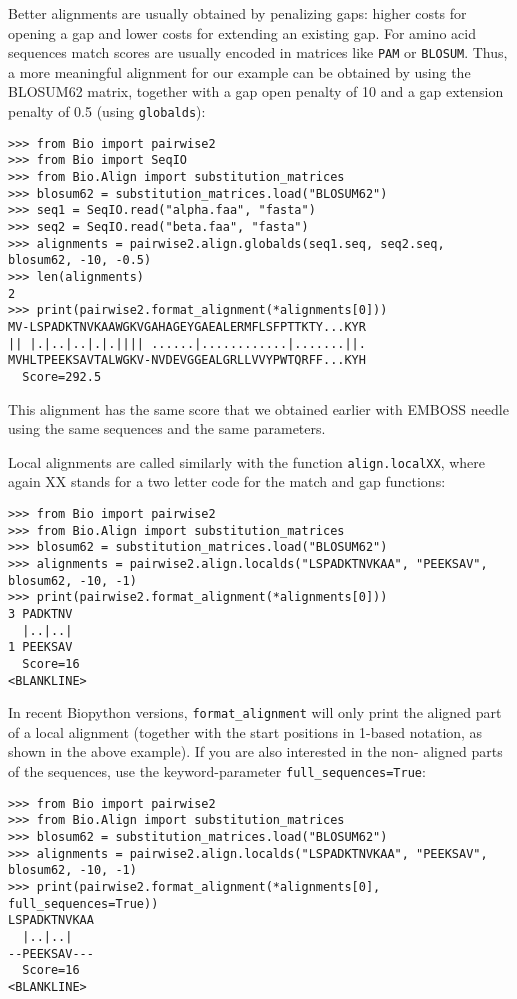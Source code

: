 Better alignments are usually obtained by penalizing gaps: higher costs
for opening a gap and lower costs for extending an existing gap. For amino
acid sequences match scores are usually encoded in matrices like \texttt{PAM}
or \texttt{BLOSUM}. Thus, a more meaningful alignment for our example can be
obtained by using the BLOSUM62 matrix, together with a gap open penalty of 10
and a gap extension penalty of 0.5 (using \verb|globalds|):

\begin{verbatim}
>>> from Bio import pairwise2
>>> from Bio import SeqIO
>>> from Bio.Align import substitution_matrices
>>> blosum62 = substitution_matrices.load("BLOSUM62")
>>> seq1 = SeqIO.read("alpha.faa", "fasta")
>>> seq2 = SeqIO.read("beta.faa", "fasta")
>>> alignments = pairwise2.align.globalds(seq1.seq, seq2.seq, blosum62, -10, -0.5)
>>> len(alignments)
2
>>> print(pairwise2.format_alignment(*alignments[0]))
MV-LSPADKTNVKAAWGKVGAHAGEYGAEALERMFLSFPTTKTY...KYR
|| |.|..|..|.|.|||| ......|............|.......||.
MVHLTPEEKSAVTALWGKV-NVDEVGGEALGRLLVVYPWTQRFF...KYH
  Score=292.5

\end{verbatim}

This alignment has the same score that we obtained earlier with EMBOSS needle
using the same sequences and the same parameters.

Local alignments are called similarly with the function \verb|align.localXX|,
where again XX stands for a two letter code for the match and gap functions:

\begin{verbatim}
>>> from Bio import pairwise2
>>> from Bio.Align import substitution_matrices
>>> blosum62 = substitution_matrices.load("BLOSUM62")
>>> alignments = pairwise2.align.localds("LSPADKTNVKAA", "PEEKSAV", blosum62, -10, -1)
>>> print(pairwise2.format_alignment(*alignments[0]))
3 PADKTNV
  |..|..|
1 PEEKSAV
  Score=16
<BLANKLINE>
\end{verbatim}

In recent Biopython versions, \verb|format_alignment| will only print the 
aligned part of a local alignment (together with the start positions in 1-based
notation, as shown in the above example). If you are also interested in the non-
aligned parts of the sequences, use the keyword-parameter \verb|full_sequences=True|:

\begin{verbatim}
>>> from Bio import pairwise2
>>> from Bio.Align import substitution_matrices
>>> blosum62 = substitution_matrices.load("BLOSUM62")
>>> alignments = pairwise2.align.localds("LSPADKTNVKAA", "PEEKSAV", blosum62, -10, -1)
>>> print(pairwise2.format_alignment(*alignments[0], full_sequences=True))
LSPADKTNVKAA
  |..|..|   
--PEEKSAV---
  Score=16
<BLANKLINE>
\end{verbatim}

